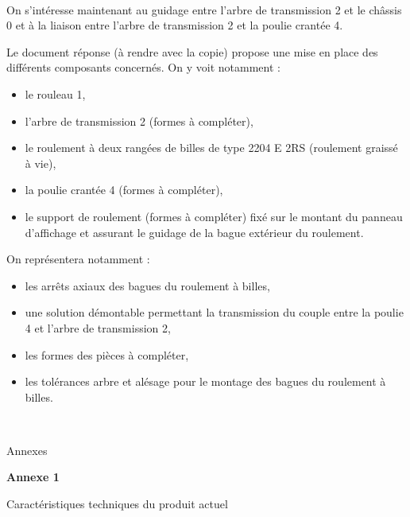 
~\

On s'intéresse maintenant au guidage entre l'arbre de transmission 2 et le châssis 0 et à la liaison entre l'arbre de transmission 2 et la poulie crantée 4.

Le document réponse (à rendre avec la copie) propose une mise en place des différents composants concernés.
On y voit notamment :
\begin{itemize}
 \item le rouleau 1,
 \item l'arbre de transmission 2 (formes à compléter),
 \item le roulement à deux rangées de billes de type 2204 E 2RS (roulement graissé à vie),
 \item la poulie crantée 4 (formes à compléter),
 \item le support de roulement (formes à compléter) fixé sur le montant du panneau d'affichage et assurant le guidage de la bague extérieur du roulement.
\end{itemize}


On représentera notamment :
\begin{itemize}
 \item les arrêts axiaux des bagues du roulement à billes,
 \item une solution démontable permettant la transmission du couple entre la poulie 4 et l'arbre de transmission 2,
 \item les formes des pièces à compléter,
 \item les tolérances arbre et alésage pour le montage des bagues du roulement à billes.
\end{itemize}

\newpage

~\

\vspace{10cm}

\begin{center}
\Huge{Annexes}
\end{center}

\newpage

\textbf{Annexe 1}

Caractéristiques techniques du produit actuel


